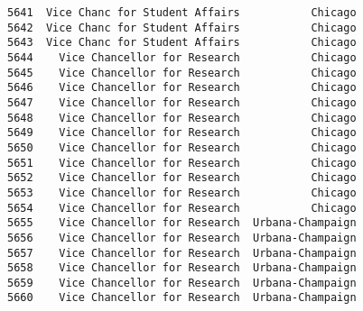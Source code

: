 \documentclass[11pt]{article}
\begin{document}
\begin{Verbatim}[commandchars=\\\{\}]
5641  Vice Chanc for Student Affairs           Chicago   
5642  Vice Chanc for Student Affairs           Chicago   
5643  Vice Chanc for Student Affairs           Chicago   
5644    Vice Chancellor for Research           Chicago   
5645    Vice Chancellor for Research           Chicago   
5646    Vice Chancellor for Research           Chicago   
5647    Vice Chancellor for Research           Chicago   
5648    Vice Chancellor for Research           Chicago   
5649    Vice Chancellor for Research           Chicago   
5650    Vice Chancellor for Research           Chicago   
5651    Vice Chancellor for Research           Chicago   
5652    Vice Chancellor for Research           Chicago   
5653    Vice Chancellor for Research           Chicago   
5654    Vice Chancellor for Research           Chicago   
5655    Vice Chancellor for Research  Urbana-Champaign   
5656    Vice Chancellor for Research  Urbana-Champaign   
5657    Vice Chancellor for Research  Urbana-Champaign   
5658    Vice Chancellor for Research  Urbana-Champaign   
5659    Vice Chancellor for Research  Urbana-Champaign   
5660    Vice Chancellor for Research  Urbana-Champaign   


\end{Verbatim}
\end{document}
